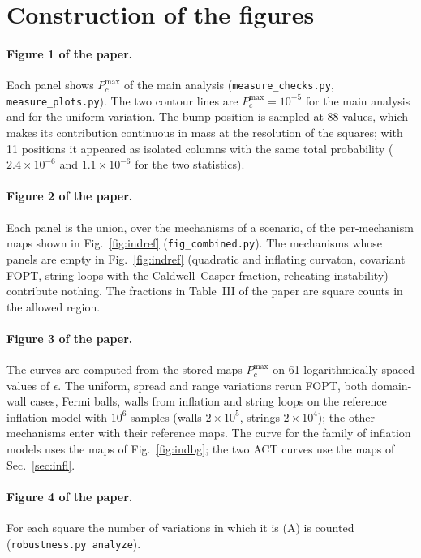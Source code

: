 \documentclass[aps,prd,onecolumn,superscriptaddress,nofootinbib,floatfix]{revtex4-2}
\newcommand{\code}[1]{\texttt{#1}}
\begin{document}
\section{Construction of the figures}\label{sec:figs}

\paragraph*{Figure 1 of the paper.}
Each panel shows $P_c^{\max}$ of the main analysis (\code{measure\_checks.py}, \code{measure\_plots.py}). The two contour lines are $P_c^{\max}=10^{-5}$ for the main analysis and for the uniform variation. The bump position is sampled at 88 values, which makes its contribution continuous in mass at the resolution of the squares; with 11 positions it appeared as isolated columns with the same total probability ($2.4\times10^{-6}$ and $1.1\times10^{-6}$ for the two statistics).

\paragraph*{Figure 2 of the paper.}
Each panel is the union, over the mechanisms of a scenario, of the per-mechanism maps shown in Fig.~\ref{fig:indref} (\code{fig\_combined.py}). The mechanisms whose panels are empty in Fig.~\ref{fig:indref} (quadratic and inflating curvaton, covariant FOPT, string loops with the Caldwell--Casper fraction, reheating instability) contribute nothing. The fractions in Table~III of the paper are square counts in the allowed region.

\paragraph*{Figure 3 of the paper.}
The curves are computed from the stored maps $P_c^{\max}$ on 61 logarithmically spaced values of $\epsilon$. The uniform, spread and range variations rerun FOPT, both domain-wall cases, Fermi balls, walls from inflation and string loops on the reference inflation model with $10^6$ samples (walls $2\times10^5$, strings $2\times10^4$); the other mechanisms enter with their reference maps. The curve for the family of inflation models uses the maps of Fig.~\ref{fig:indbg}; the two ACT curves use the maps of Sec.~\ref{sec:infl}.

\paragraph*{Figure 4 of the paper.}
For each square the number of variations in which it is (A) is counted (\code{robustness.py analyze}).
\end{document}
